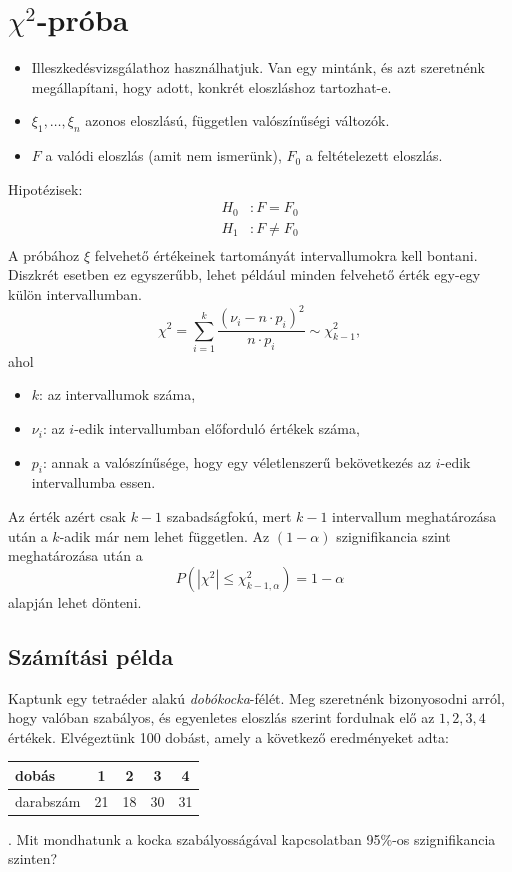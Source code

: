 \documentclass[a4paper]{article}
\begin{document}
\section{$\chi^2$-próba}

\begin{itemize}
\item Illeszkedésvizsgálathoz használhatjuk. Van egy mintánk, és azt szeretnénk megállapítani, hogy adott, konkrét eloszláshoz tartozhat-e.
\item $\xi_1, \ldots, \xi_n$ azonos eloszlású, független valószínűségi változók.
\item $F$ a valódi eloszlás (amit nem ismerünk), $F_0$ a feltételezett eloszlás.
\end{itemize}
Hipotézisek:
\begin{align*}
H_0 &: F = F_0 \\
H_1 &: F \neq F_0 \\
\end{align*}
A próbához $\xi$ felvehető értékeinek tartományát intervallumokra kell bontani.
Diszkrét esetben ez egyszerűbb, lehet például minden felvehető érték egy-egy külön intervallumban.
\[
\displaystyle
\chi^2 =
\sum_{i=1}^{k} \dfrac{(\nu_i - n \cdot p_i)^2}{n \cdot p_i}
\sim \chi_{k-1}^2,
\]
ahol
\begin{itemize}
\item $k$: az intervallumok száma,
\item $\nu_i$: az $i$-edik intervallumban előforduló értékek száma,
\item $p_i$: annak a valószínűsége, hogy egy véletlenszerű bekövetkezés az $i$-edik intervallumba essen.
\end{itemize}
Az érték azért csak $k-1$ szabadságfokú, mert $k-1$ intervallum meghatározása után a $k$-adik már nem lehet független.
Az $(1 - \alpha)$ szignifikancia szint meghatározása után a
\[
P\left(
|\chi^2| \leq \chi_{k-1, \alpha}^{2}
\right)
= 1 - \alpha
\]
alapján lehet dönteni.

\subsection{Számítási példa}

Kaptunk egy tetraéder alakú \textit{dobókocka}-félét.
Meg szeretnénk bizonyosodni arról, hogy valóban szabályos, és egyenletes eloszlás szerint fordulnak elő az $1, 2, 3, 4$ értékek.
Elvégeztünk 100 dobást, amely a következő eredményeket adta:
\begin{tabular}{l|c|c|c|c|}
dobás & 1 & 2 & 3 & 4 \\
\hline
darabszám & 21 & 18 & 30 & 31
\end{tabular}.
Mit mondhatunk a kocka szabályosságával kapcsolatban 95\%-os szignifikancia szinten?
\end{document}
